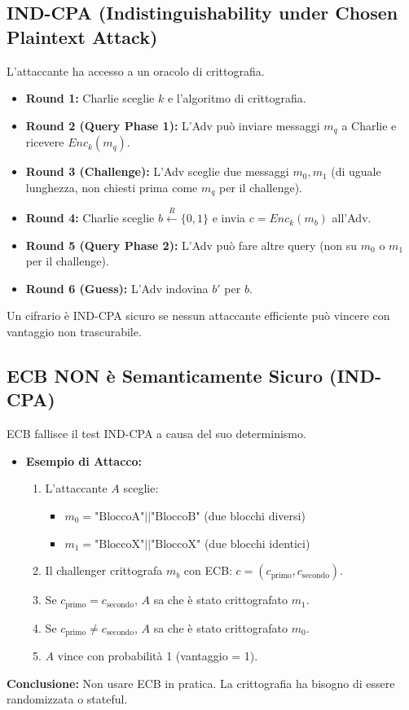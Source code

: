 \subsection{IND-CPA (Indistinguishability under Chosen Plaintext Attack)}
L'attaccante ha accesso a un oracolo di crittografia.
\begin{itemize}
    \item \textbf{Round 1:} Charlie sceglie $k$ e l'algoritmo di crittografia.
    \item \textbf{Round 2 (Query Phase 1):} L'Adv può inviare messaggi $m_q$ a Charlie e ricevere $Enc_k(m_q)$.
    \item \textbf{Round 3 (Challenge):} L'Adv sceglie due messaggi $m_0, m_1$ (di uguale lunghezza, non chiesti prima come $m_q$ per il challenge).
    \item \textbf{Round 4:} Charlie sceglie $b \xleftarrow{R} \{0,1\}$ e invia $c = Enc_k(m_b)$ all'Adv.
    \item \textbf{Round 5 (Query Phase 2):} L'Adv può fare altre query (non su $m_0$ o $m_1$ per il challenge).
    \item \textbf{Round 6 (Guess):} L'Adv indovina $b'$ per $b$.
\end{itemize}
Un cifrario è IND-CPA sicuro se nessun attaccante efficiente può vincere con vantaggio non trascurabile.

\subsection{ECB NON è Semanticamente Sicuro (IND-CPA)}
ECB fallisce il test IND-CPA a causa del suo determinismo.
\begin{itemize}
    \item \textbf{Esempio di Attacco:}
    \begin{enumerate}
        \item L'attaccante $A$ sceglie:
        \begin{itemize}
            \item $m_0 = \text{"BloccoA"} || \text{"BloccoB"}$ (due blocchi diversi)
            \item $m_1 = \text{"BloccoX"} || \text{"BloccoX"}$ (due blocchi identici)
        \end{itemize}
        \item Il challenger crittografa $m_b$ con ECB: $c = (c_{\text{primo}}, c_{\text{secondo}})$.
        \item Se $c_{\text{primo}} = c_{\text{secondo}}$, $A$ sa che è stato crittografato $m_1$.
        \item Se $c_{\text{primo}} \neq c_{\text{secondo}}$, $A$ sa che è stato crittografato $m_0$.
        \item $A$ vince con probabilità 1 (vantaggio = 1).
    \end{enumerate}
\end{itemize}
\textbf{Conclusione:} Non usare ECB in pratica. La crittografia ha bisogno di essere randomizzata o stateful.

